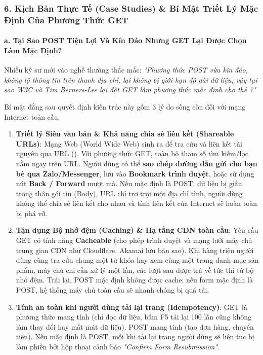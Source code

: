 \subsubsection{6. Kịch Bản Thực Tế (Case Studies) \& Bí Mật Triết Lý Mặc Định Của Phương Thức GET}

\paragraph{a. Tại Sao POST Tiện Lợi Và Kín Đáo Nhưng GET Lại Được Chọn Làm Mặc Định?}
Nhiều kỹ sư mới vào nghề thường thắc mắc: \textit{"Phương thức POST vừa kín đáo, không lộ thông tin trên thanh địa chỉ, lại không bị giới hạn độ dài dữ liệu, vậy tại sao W3C và Tim Berners-Lee lại đặt GET làm phương thức mặc định cho thẻ ?"}

Bí mật đằng sau quyết định kiến trúc này gồm 3 lý do sống còn đối với mạng Internet toàn cầu:
\begin{enumerate}[leftmargin=1.5em, itemsep=4pt, parsep=0pt]
    \item \textbf{Triết lý Siêu văn bản \& Khả năng chia sẻ liên kết (Shareable URLs)}:
    Mạng Web (World Wide Web) sinh ra để tra cứu và liên kết tài nguyên qua URL (). Với phương thức GET, toàn bộ tham số tìm kiếm/lọc nằm ngay trên URL. Người dùng có thể \textbf{sao chép đường dẫn gửi cho bạn bè qua Zalo/Messenger}, lưu vào \textbf{Bookmark trình duyệt}, hoặc sử dụng nút \textbf{Back / Forward} mượt mà. Nếu mặc định là POST, dữ liệu bị giấu trong thân gói tin (Body), URL chỉ trơ trọi một địa chỉ tĩnh, người dùng không thể chia sẻ liên kết cho nhau và tính liên kết của Internet sẽ hoàn toàn bị phá vỡ.
    
    \item \textbf{Tận dụng Bộ nhớ đệm (Caching) \& Hạ tầng CDN toàn cầu}:
    Yêu cầu GET có tính năng \textbf{Cacheable} (cho phép trình duyệt và mạng lưới máy chủ trung gian CDN như Cloudflare, Akamai lưu bản sao). Khi hàng triệu người dùng cùng tra cứu chung một từ khóa hay xem cùng một trang danh mục sản phẩm, máy chủ chỉ cần xử lý một lần, các lượt sau được trả về tức thì từ bộ nhớ đệm. Trái lại, POST mặc định không được cache; nếu form mặc định là POST, hệ thống máy chủ toàn cầu sẽ nhanh chóng bị quá tải.
    
    \item \textbf{Tính an toàn khi người dùng tải lại trang (Idempotency)}:
    GET là phương thức mang tính  (chỉ đọc dữ liệu, bấm F5 tải lại 100 lần cũng không làm thay đổi hay mất mát dữ liệu). POST mang tính  (tạo đơn hàng, chuyển tiền). Nếu mặc định là POST, mỗi khi tải lại trang người dùng sẽ liên tục bị làm phiền bởi hộp thoại cảnh báo \textit{"Confirm Form Resubmission"}.
\end{enumerate}

